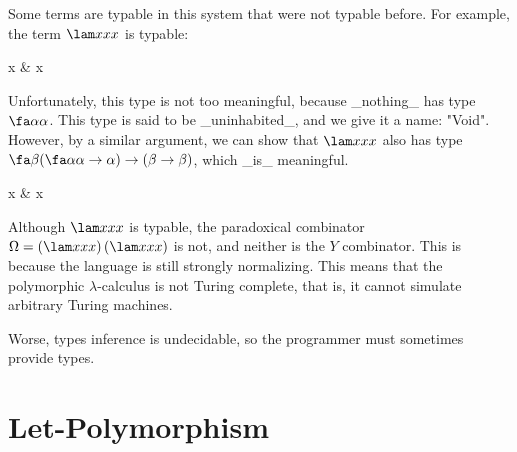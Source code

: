 Some terms are typable in this system that were not typable before.
For example, the term $\lam x{xx}$ is typable:
\begin{center}
\mbox{}
   {
      {
         {
            {x{\fa\alpha\alpha}}
         &
            {x{\fa\alpha\alpha}}}}}
\end{center}
Unfortunately, this type is not too meaningful, because _nothing_ has type $\fa\alpha\alpha$. This type is said to be _uninhabited_, and we give it a name: "Void". However, by a similar argument, we can show that $\lam x{xx}$ also has type $\fa\beta{(\fa\alpha{\alpha\to\alpha})\to{(\beta\to\beta)}}$, which _is_ meaningful.
\begin{center}
\mbox{}
   {
      {
         {
            {x{\fa\alpha{\alpha\to\alpha}}}
         &
            {x{\fa\alpha{\alpha\to\alpha}}}}}}
\end{center}

Although $\lam x{xx}$ is typable, the paradoxical combinator $\Omega = (\lam x{xx})\,(\lam x{xx})$ is not, and neither is the $Y$ combinator. This is because the language is still strongly normalizing. This means that the polymorphic $\lambda$-calculus is not Turing complete, that is, it cannot simulate arbitrary Turing machines.

Worse, types inference is undecidable, so the programmer must sometimes provide types.

\section{Let-Polymorphism}

